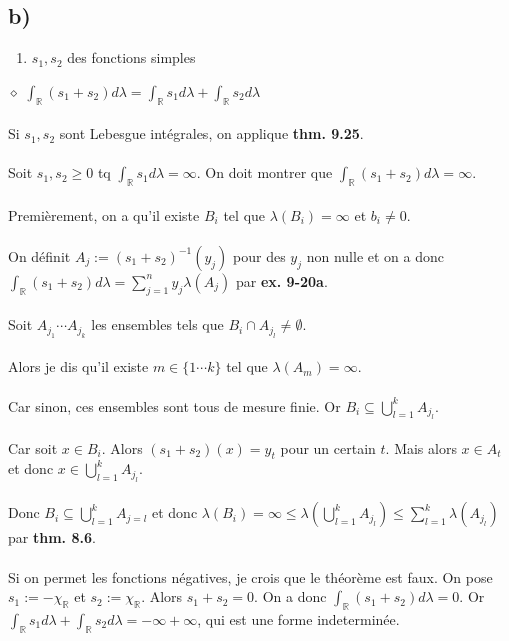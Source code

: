 \documentclass[a4paper,10pt]{article}
\begin{document}
\subsection*{b)}
\begin{enumerate}
	\item $s_1, s_2$ des fonctions simples
\end{enumerate}
$\diamond$ \textbf{$\int_{\mathbb{R}} (s_1 + s_2) d \lambda = \int_{\mathbb{R}} s_1 d \lambda + \int_{\mathbb{R}} s_2 d \lambda$}
\\
\\
Si $s_1, s_2$ sont Lebesgue intégrales, on applique \textbf{thm. 9.25}.
\\
\\
Soit $s_1, s_2 \geq 0$ tq $\int_\mathbb{R} s_1 d\lambda = \infty$. On doit montrer que $\int_\mathbb{R} (s_1 + s_2) d\lambda = \infty$.
\\
\\
Premièrement, on a qu'il existe $B_i$ tel que $\lambda (B_i) = \infty$ et $b_i \neq 0$.
\\
\\
On définit $A_j := (s_1 + s_2)^{-1}(y_j)$ pour des $y_j$ non nulle et on a donc $\int_\mathbb{R} (s_1 + s_2) d\lambda = \sum_{j=1}^n y_j \lambda (A_j)$ par \textbf{ex. 9-20a}.
\\
\\
Soit $A_{j_1} \cdots A_{j_k}$ les ensembles tels que $B_i \cap A_{j_l} \neq \emptyset$.
\\
\\
Alors je dis qu'il existe $m \in \{1 \cdots k\}$ tel que $\lambda (A_m) = \infty$.
\\
\\
Car sinon, ces ensembles sont tous de mesure finie. Or $B_i \subseteq \bigcup_{l=1}^k A_{j_l}$. 
\\
\\
Car soit $x \in B_i$. Alors $(s_1 + s_2)(x) = y_t$ pour un certain $t$. Mais alors $x \in A_t$ et donc $x \in \bigcup_{l=1}^k A_{j_l}$. 
\\
\\
Donc $B_i \subseteq \bigcup_{l=1}^k A_{j=l}$ et donc $\lambda (B_i) = \infty \leq \lambda ( \bigcup_{l=1}^k A_{j_l} ) \leq \sum_{l=1}^k \lambda(A_{j_l})$ par \textbf{thm. 8.6}.
\\
\\
Si on permet les fonctions négatives, je crois que le théorème est faux. On pose $s_1 := -\chi_{\mathbb{R}}$ et $s_2 := \chi_\mathbb{R}$. Alors $s_1 + s_2 = 0$. On a donc $\int_\mathbb{R} (s_1 + s_2)d\lambda = 0$. Or $\int_\mathbb{R} s_1 d\lambda + \int_\mathbb{R} s_2 d\lambda = -\infty + \infty$, qui est une forme indeterminée.
\end{document}
